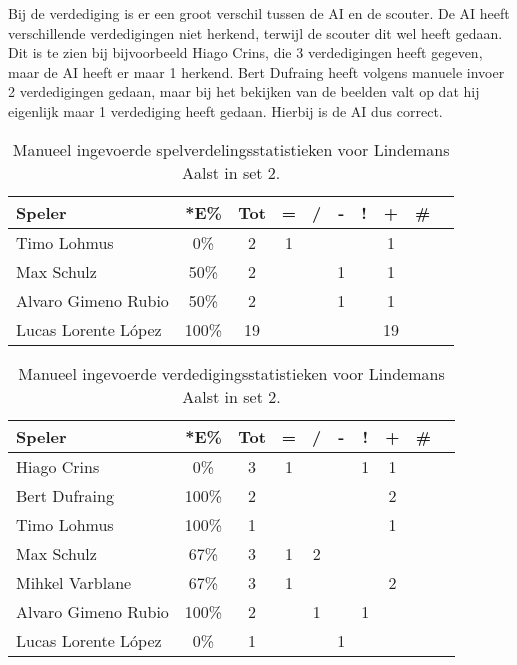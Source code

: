 Bij de verdediging is er een groot verschil tussen de AI en de scouter. De AI heeft verschillende verdedigingen niet herkend, terwijl de scouter dit wel heeft gedaan. Dit is te zien bij bijvoorbeeld Hiago Crins, die 3 verdedigingen heeft gegeven, maar de AI heeft er maar 1 herkend. Bert Dufraing heeft volgens manuele invoer 2 verdedigingen gedaan, maar bij het bekijken van de beelden valt op dat hij eigenlijk maar 1 verdediging heeft gedaan. Hierbij is de AI dus correct.

\begin{table}[ht!]
  \centering
  \scriptsize
    \begin{tabular}{|l|c|c|c|c|c|c|c|c|c|} \hline
      \textbf{Speler} & *E\% & Tot & = & / & - & ! & + & \# \\ \hline
      Timo Lohmus & 0\% & 2 & 1 &  &  &  & 1 &   \\
      Max Schulz & 50\% & 2 &  &  & 1 & & 1 &  \\
      Alvaro Gimeno Rubio & 50\% & 2 &  &  & 1 &  & 1 &   \\ 
      Lucas Lorente López & 100\% & 19 &  &  &  &  & 19 &  \\ \hline
  \end{tabular}
  \caption[Manueel ingevoerde spelverdelingsstatistieken voor Lindemans Aalst in set 2]{\label{tab:PL1SetAalstMan2}Manueel ingevoerde spelverdelingsstatistieken voor Lindemans Aalst in set 2.}
\end{table}

\begin{table}[ht!]
  \centering
  \scriptsize
    \begin{tabular}{|l|c|c|c|c|c|c|c|c|c|}
      \hline
      \textbf{Speler} & *E\% & Tot & = & / & - & ! & + & \# \\ \hline
      Hiago Crins & 0\% & 3 & 1 &  &  & 1 & 1 &  \\ 
      Bert Dufraing & 100\% & 2 &  &  &  &  & 2 &  \\
      Timo Lohmus & 100\% & 1 &  &  &  &  & 1 &  \\
      Max Schulz & 67\% & 3 & 1 & 2 &  &  &  &  \\
      Mihkel Varblane & 67\% & 3 & 1 &  &  &  & 2 &  \\
      Alvaro Gimeno Rubio & 100\% & 2 &  & 1 &  & 1 &  &  \\
      Lucas Lorente López & 0\% & 1 &  &  & 1 &  &  &  \\ \hline
  \end{tabular}
  \caption[Manueel ingevoerde verdedigingsstatistieken voor Lindemans Aalst in set 2]{\label{tab:PL1DigAalstMan2}Manueel ingevoerde verdedigingsstatistieken voor Lindemans Aalst in set 2.}
\end{table}

